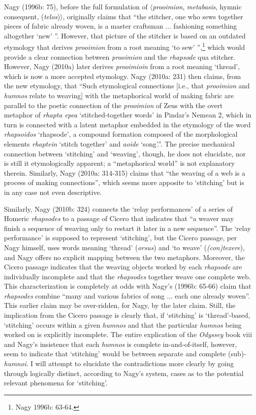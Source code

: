 \documentclass[12pt]{article}
\begin{document}
Nagy (1996b: 75), before the full formulation of $\langle$\textit{prooimion}, \textit{metabasis}, hymnic consequent, (\textit{telos})$\rangle$, originally claims that ``the stitcher, one who sews together pieces of fabric already woven, is a master craftsman ... fashioning something altogether `new' ''. However, that picture of the stitcher is based on an outdated etymology that derives \textit{prooimion} from a root meaning `to sew' '',\footnote{ Nagy 1996b: 63-64.} which would provide a clear connection between \textit{prooimion} and the \textit{rhapsode} qua stitcher. However, Nagy (2010a) later derives \textit{prooimioin} from a root meaning `thread', which is now a more accepted etymology. Nagy (2010a: 231) then claims, from the new etymology, that ``Such etymological connections [i.e., that \textit{prooimion} and \textit{humnos} relate to weaving] with the metaphorical world of making fabric are parallel to the poetic connection of the \textit{prooimion} of Zeus with the overt metaphor of \textit{rhapta epea} ‘stitched-together words’ in Pindar’s Nemean 2, which in turn is connected with a latent metaphor embedded in the etymology of the word \textit{rhapsoidos} ‘rhapsode’, a compound formation composed of the morphological elements \textit{rhaptein} ‘stitch together’ and \textit{aoide} ‘song’.''. The precise mechanical connection between `stitching' and `weaving', though, he does not elucidate, nor is still it etymologically apparent; a ``metaphorical world'' is not explanatory therein. Similarly, Nagy (2010a: 314-315) claims that ``the weaving of a web is a process of making connections'', which seems more apposite to `stitching' but is in any case not even descriptive.

Similarly, Nagy (2010b: 324) connects the `relay performances' of a series of Homeric \textit{rhapsodes} to a passage of Cicero that indicates that ``a weaver may finish a sequence of weaving only to restart it later in a new sequence''. The `relay performance' is supposed to represent `stitching', but the Cicero passage, per Nagy himself, uses words meaning `thread' (\textit{orsus}) and `to weave' (\textit{(con)texere}), and Nagy offers no explicit mapping between the two metaphors. Moreover, the Cicero passage indicates that the weaving objects worked by each \textit{rhapsode} are individually incomplete and that the \textit{rhapsodes} together weave one complete web. This characterization is completely at odds with Nagy's (1996b: 65-66) claim that \textit{rhapsodes} combine ``many and various fabrics of song ... each one already woven''. This earlier claim may be over-ridden, for Nagy, by the later claim. Still, the implication from the Cicero passage is clearly that, if `stitching' is `thread'-based, `stitching' occurs within a given \textit{humnos} and that the particular \textit{humnos} being worked on is explicitly incomplete. The entire explication of the \textit{Odyssey} book viii and Nagy's insistence that each \textit{humnos} is complete in-and-of-itself, however, seem to indicate that `stitching' would be between separate and complete (sub)-\textit{humnoi}. I will attempt to elucidate the contradictions more clearly by going through logically distinct, according to Nagy's system, cases as to the potential relevant phenomena for `stitching'.
\end{document}
